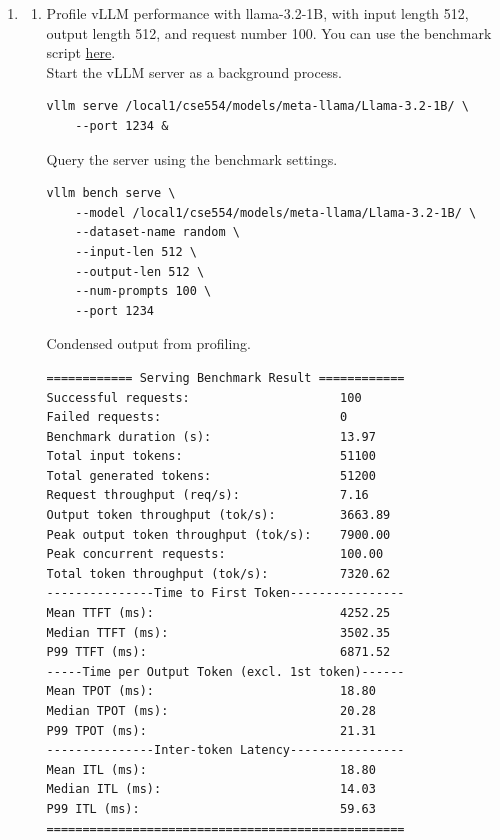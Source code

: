 \documentclass[12pt]{article}
\begin{document}
\begin{enumerate}[label=\textbf{Q\arabic*.}]
\begin{enumerate}
    \end{enumerate}

    \item %
    \begin{enumerate}
        \item Profile vLLM performance with llama-3.2-1B, with input length 512, output length 512, and request number 100. You can use the benchmark script \href{https://docs.vllm.ai/en/stable/cli/bench/serve/}{here}.  \\

Start the vLLM server as a background process.
\begin{verbatim}
vllm serve /local1/cse554/models/meta-llama/Llama-3.2-1B/ \
    --port 1234 &
\end{verbatim}
Query the server using the benchmark settings.
\begin{verbatim}
vllm bench serve \
    --model /local1/cse554/models/meta-llama/Llama-3.2-1B/ \
    --dataset-name random \
    --input-len 512 \
    --output-len 512 \
    --num-prompts 100 \
    --port 1234
\end{verbatim}
Condensed output from profiling.
\begin{verbatim}
============ Serving Benchmark Result ============
Successful requests:                     100       
Failed requests:                         0         
Benchmark duration (s):                  13.97     
Total input tokens:                      51100     
Total generated tokens:                  51200     
Request throughput (req/s):              7.16      
Output token throughput (tok/s):         3663.89   
Peak output token throughput (tok/s):    7900.00   
Peak concurrent requests:                100.00    
Total token throughput (tok/s):          7320.62   
---------------Time to First Token----------------
Mean TTFT (ms):                          4252.25   
Median TTFT (ms):                        3502.35   
P99 TTFT (ms):                           6871.52   
-----Time per Output Token (excl. 1st token)------
Mean TPOT (ms):                          18.80     
Median TPOT (ms):                        20.28     
P99 TPOT (ms):                           21.31     
---------------Inter-token Latency----------------
Mean ITL (ms):                           18.80     
Median ITL (ms):                         14.03     
P99 ITL (ms):                            59.63     
==================================================    
\end{verbatim}


\end{enumerate}
\end{enumerate}
\end{document}
